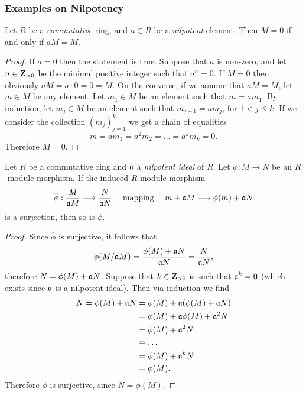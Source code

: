\subsubsection{Examples on Nilpotency}

\begin{lemma}
\label{lem:nakayama-particular-case}
Let \(R\) be a \emph{commutative} ring, and \(a \in R\) be a \emph{nilpotent}
element. Then \(M = 0\) if and only if \(a M = M\).
\end{lemma}

\begin{proof}
If \(a = 0\) then the statement is true. Suppose that \(a\) is non-zero, and let
\(n \in \mathbf{Z}_{>0}\) be the minimal positive integer such that \(a^n = 0\). If
\(M = 0\) then obviously \(a M = a \cdot 0 = 0 = M\). On the converse, if we
assume that \(a M = M\), let \(m \in M\) be any element. Let \(m_1 \in M\) be an
element such that \(m = a m_1\). By induction, let \(m_j \in M\) be an element
such that \(m_{j-1} = a m_j\), for \(1 < j \leq k\). If we consider the
collection \((m_j)_{j=1}^k\) we get a chain of equalities
\[
m = a m_1 = a^2 m_2 = \dots = a^k m_k = 0.
\]
Therefore \(M = 0\).
\end{proof}

\begin{proposition}
\label{prop:induced-surjective-nilpotent-ideal}
Let \(R\) be a commutative ring and \(\mathfrak{a}\) a \emph{nilpotent ideal} of
\(R\). Let \(\phi: M \to N\) be an \(R\)-module morphism. If the induced
\(R\)-module morphism
\[
\overline{\phi}: \frac{M}{\mathfrak{a} M} \longrightarrow \frac{N}{\mathfrak{a} N}
\quad\text{ mapping }\quad
m + \mathfrak{a} M \longmapsto \phi(m) + \mathfrak{a} N
\]
is a surjection, then so is \(\phi\).
\end{proposition}

\begin{proof}
Since \(\overline{\phi}\) is surjective, it follows that
\[
\overline{\phi}(M/\mathfrak{a} M) = \frac{\phi(M) + \mathfrak{a} N}{\mathfrak{a} N}
= \frac{N}{\mathfrak{a} N},
\]
therefore \(N = \phi(M) + \mathfrak{a} N\). Suppose that \(k \in \mathbf{Z}_{> 0}\) is such
that \(\mathfrak{a}^k = 0\) (which exists since \(\mathfrak{a}\) is a nilpotent
ideal). Then via induction we find
\begin{align*}
  N = \phi(M) + \mathfrak{a} N
  &= \phi(M) + \mathfrak{a}(\phi(M) + \mathfrak{a} N) \\
  &= \phi(M) + \mathfrak{a} \phi(M) + \mathfrak{a}^2 N \\
  &= \phi(M) + \mathfrak{a}^2 N \\
  &= \dots \\
  &= \phi(M) + \mathfrak{a}^k N \\
  &= \phi(M).
\end{align*}
Therefore \(\phi\) is surjective, since \(N = \phi(M)\).
\end{proof}

